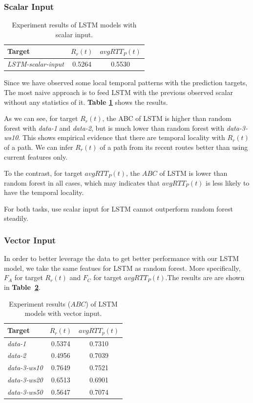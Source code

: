 \documentclass[sigconf]{acmart}
\begin{document}
\subsubsection{Scalar Input}
\begin{table}[t]
	\centering
	\begin{tabular}{lcc}
		\toprule
		{Target} &{$R_r(t)$} &{$avgRTT_P(t)$}\\
		\midrule
		\textit{LSTM-scalar-input} & 0.5264& 0.5530  \\
		\bottomrule
	\end{tabular}
	\caption{ Experiment results of LSTM models with scalar input. }
	\label{tab:lstm-scalar}
\end{table}

Since we have observed some local temporal patterns with the prediction targets, The most naive approach is to feed LSTM with the previous observed scalar without any statistics of it. \textbf{Table \ref{tab:lstm-scalar}} shows the results.

As we can see, for target $R_r(t)$, the ABC of LSTM is higher than random forest with \textit{data-1} and \textit{data-2}, but is much lower than random forest with \textit{data-3-ws10}. This shows empirical evidence that there are temporal locality with $R_r(t)$ of a path. We can infer $R_r(t)$ of a path from its recent routes better than using current features only.

To the contrast, for target $avgRTT_P(t)$, the $ABC$ of LSTM is lower than random forest in all cases, which may indicates that $avgRTT_P(t)$ is less likely to have the temporal locality.

For both tasks, use scalar input for LSTM cannot outperform random forest steadily.

\subsubsection{Vector Input}
In order to better leverage the data to get better performance with our LSTM model, we take the same featues for LSTM as random forest. More specifically, $F_A$ for target $R_r(t)$ and $F_C$ for target $avgRTT_P(t)$.The results are are shown in \textbf{Table~\ref{tab:lstm-vector}}.
\begin{table}[t]
	\centering
	\begin{tabular}{lcc}
		\toprule
		{Target} &{$R_r(t)$}&{$avgRTT_p(t)$} \\
		\midrule
		\textit{data-1}& 0.5374 & 0.7310 \\
		\textit{data-2}& 0.4956& 0.7039     \\
		\textit{data-3-ws10}& 0.7649 & 0.7521 \\
		\textit{data-3-ws20}& 0.6513& 0.6901    \\
		\textit{data-3-ws50}& 0.5647& 0.7074  \\
		\bottomrule	
	\end{tabular}
	\caption{ Experiment results ($ABC$) of LSTM models with vector input. }
	\label{tab:lstm-vector}
\end{table}
\end{document}
